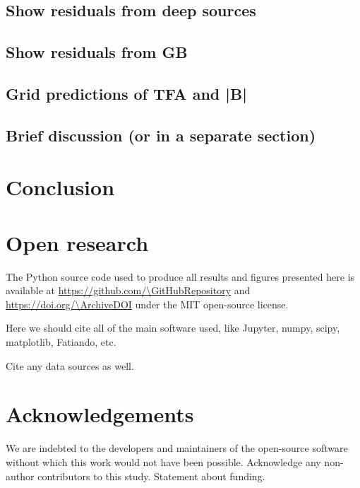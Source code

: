 \subsection{Show residuals from deep sources}

\subsection{Show residuals from GB}

\subsection{Grid predictions of TFA and |B|}

\subsection{Brief discussion (or in a separate section)}



\section{Conclusion}

\lipsum[1]


\section{Open research}

The Python source code used to produce all results and figures presented here
is available at \url{https://github.com/\GitHubRepository} and
\url{https://doi.org/\ArchiveDOI} under the MIT open-source license.

Here we should cite all of the main software used, like Jupyter, numpy, scipy,
matplotlib, Fatiando, etc.

Cite any data sources as well.

\section{Acknowledgements}

We are indebted to the developers and maintainers of the open-source software
without which this work would not have been possible.
Acknowledge any non-author contributors to this study.
Statement about funding.

